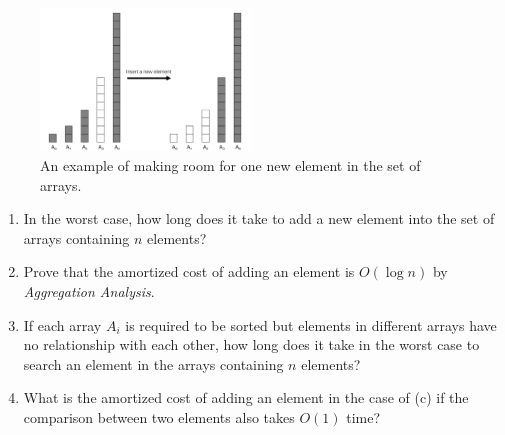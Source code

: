 \documentclass[12pt,a4paper]{article}
\theoremstyle{definition}
\begin{document}
\begin{enumerate}
	\begin{figure}[!htbp]
	\centering
	\includegraphics[width=0.5\textwidth]{Fig-MultiArray.pdf}
	\caption{An example of making room for one new element in the set of arrays.}
	\label{Fig-MultiArray}
	\end{figure}

    \begin{enumerate}
        \item In the worst case, how long does it take to add a new element into the set of arrays containing $n$ elements?
        \item Prove that the amortized cost of adding an element is $O(\log n)$ by \emph{Aggregation Analysis}.
        \item If each array $A_i$ is required to be sorted but elements in different arrays have no relationship with each other, how long does it take in the worst case to search an element in the arrays containing $n$ elements? 
\item What is the amortized cost of adding an element in the case of (c) if the comparison between two elements also takes $O(1)$ time?
    \end{enumerate}
    

\end{enumerate}
\end{document}
